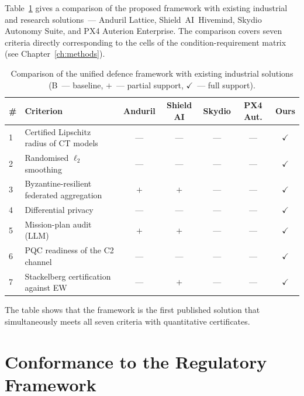Table~\ref{tab:uav_industry_cmp} gives a comparison of the proposed
framework with existing industrial and research solutions~--- Anduril
Lattice, Shield~AI~Hivemind, Skydio Autonomy Suite, and PX4 Auterion
Enterprise. The comparison covers seven criteria directly
corresponding to the cells of the condition-requirement matrix
(see Chapter~\ref{ch:methods}).

\begin{table}[H]
\centering
\caption{Comparison of the unified defence framework with existing
industrial solutions (B~--- baseline, $+$~--- partial support,
$\checkmark$~--- full support).}
\label{tab:uav_industry_cmp}
\small
\setlength{\tabcolsep}{3pt}
\renewcommand{\arraystretch}{1.15}
\begin{tabularx}{\linewidth}{@{}lXccccc@{}}
\toprule
\# & \textbf{Criterion}
   & \textbf{Anduril} & \textbf{Shield AI} & \textbf{Skydio} & \textbf{PX4 Aut.} & \textbf{Ours}\\
\midrule
1 & Certified Lipschitz radius of CT models       & ---   & ---   & ---   & ---   & $\checkmark$\\
2 & Randomised $\ell_2$ smoothing                  & ---   & ---   & ---   & ---   & $\checkmark$\\
3 & Byzantine-resilient federated aggregation     & $+$   & $+$   & ---   & ---   & $\checkmark$\\
4 & Differential privacy                          & ---   & ---   & ---   & ---   & $\checkmark$\\
5 & Mission-plan audit (LLM)                      & $+$   & $+$   & ---   & ---   & $\checkmark$\\
6 & PQC readiness of the C2 channel               & ---   & ---   & ---   & ---   & $\checkmark$\\
7 & Stackelberg certification against EW          & ---   & $+$   & ---   & ---   & $\checkmark$\\
\bottomrule
\end{tabularx}
\end{table}

The table shows that the framework is the first published solution
that simultaneously meets all seven criteria with quantitative
certificates.


\section{Conformance to the Regulatory Framework}
\label{sec:uav_regulation}

